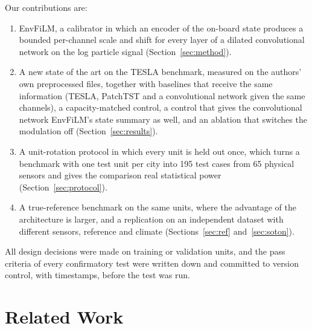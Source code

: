 \documentclass[journal]{IEEEtran}
\begin{document}
Our contributions are:
\begin{enumerate}
\item EnvFiLM, a calibrator in which an encoder of the on-board state produces a bounded per-channel scale
and shift for every layer of a dilated convolutional network on the log particle signal
(Section~\ref{sec:method}).
\item A new state of the art on the TESLA benchmark, measured on the authors' own preprocessed files, together with
baselines that receive the same information (TESLA, PatchTST and a convolutional network given the same channels), a
capacity-matched control, a control that gives the convolutional network EnvFiLM's state summary as well, and an
ablation that switches the modulation off (Section~\ref{sec:results}).
\item A unit-rotation protocol in which every unit is held out once, which turns a benchmark with one test unit per
city into 195 test cases from 65 physical sensors and gives the comparison real statistical power (Section~\ref{sec:protocol}).
\item A true-reference benchmark on the same units, where the advantage of the architecture is larger, and a
replication on an independent dataset with different sensors, reference and climate (Sections~\ref{sec:ref}
and~\ref{sec:soton}).
\end{enumerate}
All design decisions were made on training or validation units, and the pass criteria of every confirmatory test were
written down and committed to version control, with timestamps, before the test was run.

\section{Related Work}
\end{document}
